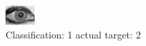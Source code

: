 \begin{figure}[h!]
\begin{center}
\includegraphics[width=0.60\columnwidth]{figures/ID2035_class_1_target_2.png}
\end{center}
\caption{ Classification: 1 actual target: 2}
\label{fig:ID2035_class_1_target_2}
\end{figure}
